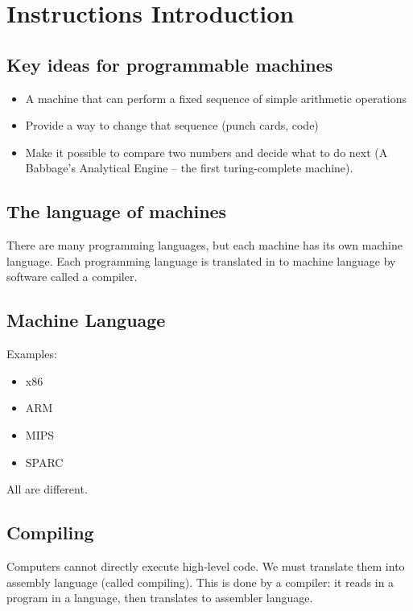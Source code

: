 \section{Instructions Introduction}\label{sec:instructions_introduction}

\subsection{Key ideas for programmable machines}\label{sub:key_ideas_for_programmable_machines}

\begin{itemize}
	\item   A machine that can perform a fixed sequence of simple arithmetic operations
	\item Provide a way to change that sequence (punch cards, code)
	\item Make it possible to compare two numbers and decide what to do next (A Babbage's Analytical Engine -- the first turing-complete machine).
\end{itemize}

\subsection{The language of machines}\label{sub:the_language_of_machines}

There are many programming languages, but each machine has its own machine language.
Each programming language is translated in to machine language by software called a compiler.

\subsection{Machine Language}\label{sub:machine_language}

Examples:
\begin{itemize}
	\item x86
	\item ARM
	\item MIPS
	\item SPARC
\end{itemize}
All are different.

\subsection{Compiling}\label{sub:compiling}

Computers cannot directly execute high-level code.
We must translate them into assembly language (called compiling).
This is done by a compiler: it reads in a program in a language, then translates to assembler language.

